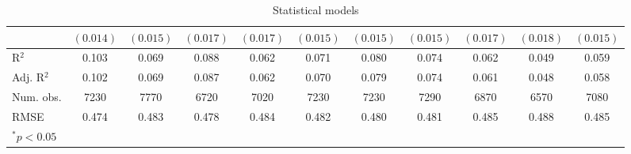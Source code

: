 \begin{table}
\begin{center}
\begin{tabular}{l c c c c c c c c c c }
                         & $(0.014)$    & $(0.015)$    & $(0.017)$    & $(0.017)$    & $(0.015)$    & $(0.015)$    & $(0.015)$    & $(0.017)$    & $(0.018)$    & $(0.015)$    \\
\hline
R$^2$                    & 0.103        & 0.069        & 0.088        & 0.062        & 0.071        & 0.080        & 0.074        & 0.062        & 0.049        & 0.059        \\
Adj. R$^2$               & 0.102        & 0.069        & 0.087        & 0.062        & 0.070        & 0.079        & 0.074        & 0.061        & 0.048        & 0.058        \\
Num. obs.                & 7230         & 7770         & 6720         & 7020         & 7230         & 7230         & 7290         & 6870         & 6570         & 7080         \\
RMSE                     & 0.474        & 0.483        & 0.478        & 0.484        & 0.482        & 0.480        & 0.481        & 0.485        & 0.488        & 0.485        \\
\hline
\multicolumn{11}{l}{\scriptsize{$^*p<0.05$}}
\end{tabular}
\caption{Statistical models}
\label{table:coefficients}
\end{center}
\end{table}
